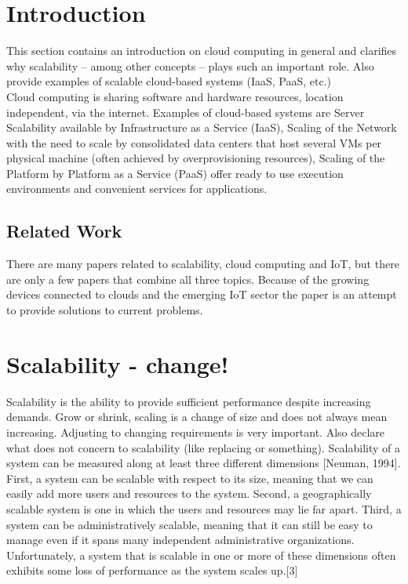 \documentclass[sigconf]{acmart}
\begin{document}

\maketitle

\section{Introduction}
This section contains an introduction on cloud computing
in general and clarifies why scalability – among other
concepts – plays such an important role. Also provide examples
of scalable cloud-based systems (IaaS, PaaS, etc.) \\
Cloud computing is sharing software and hardware resources,
location independent, via the internet. Examples of cloud-based
systems are Server Scalability available by Infrastructure as a
Service (IaaS), Scaling of the Network with the need to scale
by consolidated data centers that host several VMs per physical
machine (often achieved by overprovisioning resources),
Scaling of the Platform by Platform as a Service (PaaS) offer
ready to use execution environments and convenient services
for applications.

\subsection{Related Work}
There are many papers related to scalability, cloud computing
and IoT, but there are only a few papers that combine all three
topics. Because of the growing devices connected to clouds
and the emerging IoT sector the paper is an attempt to provide
solutions to current problems.

\section{Scalability - change!}
Scalability is the ability to provide sufficient performance
despite increasing demands. Grow or shrink, scaling is a change
of size and does not always mean increasing. Adjusting to
changing requirements is very important. Also declare what
does not concern to scalability (like replacing or something).
Scalability of a system can be measured along at least three
different dimensions [Neuman, 1994]. First, a system can be
scalable with respect to its size, meaning that we can easily
add more users and resources to the system. Second, a
geographically scalable system is one in which the users
and resources may lie far apart. Third, a system can be
administratively scalable, meaning that it can still be easy to
manage even if it spans many independent administrative
organizations. Unfortunately, a system that is scalable in one
or more of these dimensions often exhibits some loss of
performance as the system scales up.[3]
\end{document}
